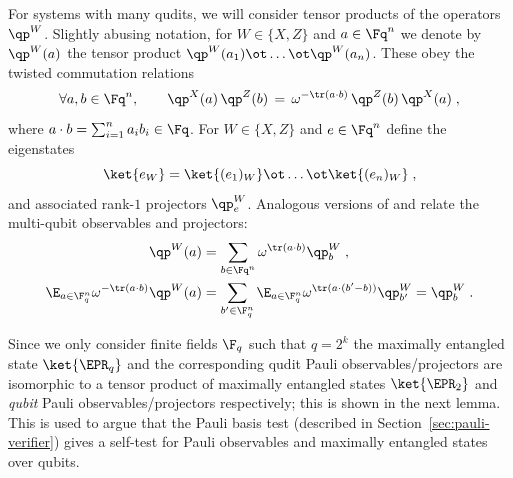 For systems with many qudits, we will consider tensor products of the operators
$\qp^W$.
Slightly abusing notation, for $W \in \{X, Z\}$ and $a \in \Fq^n$ we denote by
$\qp^W(a)$ the tensor product $\qp^W(a_1) \ot \dots \ot \qp^W(a_n)$.
These obey the twisted commutation relations
\begin{equation*}
  \forall a,b\in \Fq^n,\qquad \qp^X(a)\, \qp^Z(b) \,=\, \omega^{-\tr (a \cdot
    b)}\, \qp^Z(b)\, \qp^X(a)\;,
\end{equation*}
where $a \cdot b = \sum_{i=1}^{n} a_i b_i \in \Fq$.
For $W\in\{X,Z\}$ and $e \in \Fq^n$ define the eigenstates
\[ \ket{e_W} = \ket{(e_1)_W} \ot \dots \ot \ket{(e_n)_W}\;, \]
and associated rank-$1$ projectors $\qp^W_e$. Analogous versions of 
and  relate the multi-qubit observables
and projectors:
\begin{align}
  \qp^W(a) &= \sum_{b \in \Fq^n} \omega^{\tr(a \cdot b)}
  \qp^W_b\;, \label{eq:pauli-obs-proj} \\
    \E_{a\in \F_q^n} \omega^{-\tr(a \cdot b)} \qp^W(a) &= \sum_{b'\in \F_q^n} \E_{a\in \F_q^n}
  \omega^{\tr(a\cdot (b'-b))} \qp^W_{b'} = \qp^W_b\;. \label{eq:pauli-inversion-0}
\end{align}

Since we only consider finite fields $\F_q$ such that $q = 2^k$ the maximally
entangled state $\ket{\EPR_q}$ and the corresponding qudit Pauli
observables/projectors are isomorphic to a tensor product of maximally entangled
states $\ket{\EPR_2}$ and \emph{qubit} Pauli observables/projectors
respectively; this is shown in the next lemma.
This is used to argue that the Pauli basis test (described in
Section~\ref{sec:pauli-verifier}) gives a self-test for Pauli observables and
maximally entangled states over qubits.


